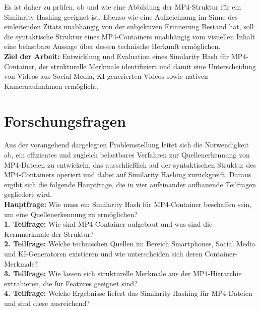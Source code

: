Es ist daher zu prüfen, ob und wie eine Abbildung der MP4-Struktur für ein Similarity Hashing geeignet ist. Ebenso wie eine Aufzeichnung im Sinne des einleitenden Zitats unabhängig von der subjektiven Erinnerung Bestand hat, soll die syntaktische Struktur eines MP4-Containers unabhängig vom visuellen Inhalt eine belastbare Aussage über dessen technische Herkunft ermöglichen.\\

\textbf{Ziel der Arbeit:} Entwicklung und Evaluation eines Similarity Hash für MP4-Container, der strukturelle Merkmale identifiziert und damit eine Unterscheidung von Videos aus Social Media, KI-generierten Videos sowie nativen Kameraaufnahmen ermöglicht.


\section{Forschungsfragen}
\label{sec:ff}

Aus der vorangehend dargelegten Problemstellung leitet sich die Notwendigkeit ab, ein effizientes und zugleich belastbares Verfahren zur Quellenerkennung von MP4-Dateien zu entwickeln, das ausschließlich auf der syntaktischen Struktur des MP4-Containers operiert und dabei auf Similarity Hashing zurückgreift. Daraus ergibt sich die folgende Hauptfrage, die in vier aufeinander aufbauende Teilfragen gegliedert wird.\\


\textbf{Hauptfrage:} Wie muss ein Similarity Hash für MP4-Container beschaffen sein, um eine Quellenerkennung zu ermöglichen?\\

\textbf{1. Teilfrage:} Wie sind MP4-Container aufgebaut und was sind die Kernmerkmale der Struktur?\\

\textbf{2. Teilfrage:} Welche technischen Quellen im Bereich Smartphones, Social Media und KI-Generatoren existieren und wie unterscheiden sich deren Container-Merkmale?\\

\textbf{3. Teilfrage:} Wie lassen sich strukturelle Merkmale aus der MP4-Hierarchie extrahieren, die für Features geeignet sind?\\

\textbf{4. Teilfrage:} Welche Ergebnisse liefert das Similarity Hashing für MP4-Dateien und sind diese ausreichend?\\


